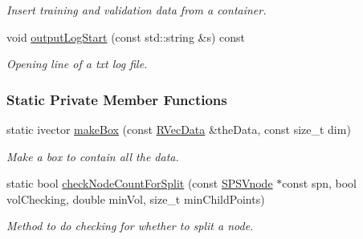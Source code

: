 \begin{DoxyCompactItemize}
\begin{DoxyCompactList}\small\item\em \-Insert training and validation data from a container. \end{DoxyCompactList}\item 
void \hyperlink{classsubpavings_1_1AdaptiveHistogramValidation_a34f7487fd92886151634c00e8e75cca5}{output\-Log\-Start} (const std\-::string \&s) const 
\begin{DoxyCompactList}\small\item\em \-Opening line of a txt log file. \end{DoxyCompactList}\end{DoxyCompactItemize}
\subsubsection*{\-Static \-Private \-Member \-Functions}
\begin{DoxyCompactItemize}
\item 
static ivector \hyperlink{classsubpavings_1_1AdaptiveHistogramValidation_abaa0f3ffd23bccd07a2c4a4b9a60e579}{make\-Box} (const \hyperlink{namespacesubpavings_a30e15e24c8d81a2160d7422ef3c39d68}{\-R\-Vec\-Data} \&the\-Data, const size\-\_\-t dim)
\begin{DoxyCompactList}\small\item\em \-Make a box to contain all the data. \end{DoxyCompactList}\item 
static bool \hyperlink{classsubpavings_1_1AdaptiveHistogramValidation_ae63a7462ea0b3f0fc11ff45eff208cd0}{check\-Node\-Count\-For\-Split} (const \hyperlink{classsubpavings_1_1SPSVnode}{\-S\-P\-S\-Vnode} $\ast$const spn, bool vol\-Checking, double min\-Vol, size\-\_\-t min\-Child\-Points)
\begin{DoxyCompactList}\small\item\em \-Method to do checking for whether to split a node. \end{DoxyCompactList}\end{DoxyCompactItemize}

